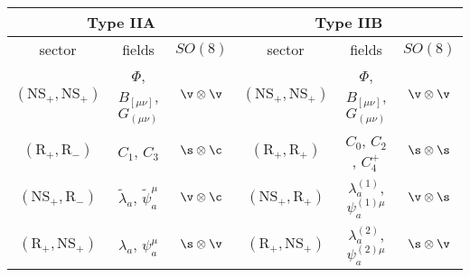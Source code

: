 \begin{tabular}{|ccc|ccc|}
    \hline
    \multicolumn{3}{|c|}{\textbf{Type IIA}} & \multicolumn{3}{c|}{\textbf{Type IIB}} \\ \hline
    \multicolumn{1}{|c|}{sector}  & fields & \multicolumn{1}{|c|}{$SO(8)$} & \multicolumn{1}{c|}{sector}  & fields & \multicolumn{1}{|c|}{$SO(8)$}  \\ \hline
    \multicolumn{1}{|c|}{$(\text{NS}_+, \text{NS}_+)$} & $\Phi$, $B_{[\mu\nu]}$, $G_{(\mu\nu)}$ & \multicolumn{1}{|c|}{$\v \otimes \v$} & \multicolumn{1}{c|}{$(\text{NS}_+, \text{NS}_+)$}        &      $\Phi$, $B_{[\mu\nu]}$, $G_{(\mu\nu)}$  & \multicolumn{1}{|c|}{$\v \otimes \v$} \\ \hline
    \multicolumn{1}{|c|}{$(\text{R}_+, \text{R}_-)$} &$C_1$, $C_3$  & \multicolumn{1}{|c|}{$\s\otimes\c$} & \multicolumn{1}{c|}{$(\text{R}_+, \text{R}_+)$}        &    $C_0$, $C_2$, $C_4^+$   & \multicolumn{1}{|c|}{$\s\otimes\s$}  \\ \hline
    \multicolumn{1}{|c|}{$(\text{NS}_+,\text{R}_-)$}        &     $\tilde{\lambda}_a$, $\tilde{\psi}^\mu_a$  & \multicolumn{1}{|c|}{$\v\otimes\c$}  & \multicolumn{1}{c|}{$(\text{NS}_+,\text{R}_+)$}        &     ${\lambda}^{(1)}_a$, ${\psi}^{(1)\mu}_a$  & \multicolumn{1}{|c|}{$\v\otimes\s$}  \\ \hline


    \multicolumn{1}{|c|}{$(\text{R}_+, \text{NS}_+)$}        &     ${\lambda}_a$, ${\psi}^\mu_a$ & \multicolumn{1}{|c|}{$\s\otimes\v$}   & \multicolumn{1}{c|}{$(\text{R}_+, \text{NS}_+)$}        &     ${\lambda}^{(2)}_a$, ${\psi}^{(2)\mu}_a$  & \multicolumn{1}{|c|}{$\s\otimes\v$}  \\ \hline
    \end{tabular}